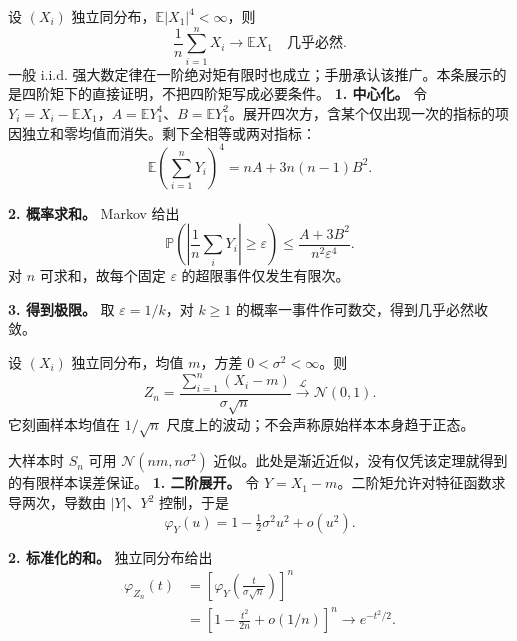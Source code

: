 设 $(X_i)$ 独立同分布，$\mathbb E|X_1|^4<\infty$，则
\[
\frac1n\sum_{i=1}^nX_i
\longrightarrow\mathbb EX_1\quad\text{几乎必然}.
\]
一般 i.i.d. 强大数定律在一阶绝对矩有限时也成立；手册承认该推广。本条展示的是四阶矩下的直接证明，不把四阶矩写成必要条件。
\textbf{1. 中心化。} 令 $Y_i=X_i-\mathbb EX_1$，$A=\mathbb EY_1^4$、$B=\mathbb EY_1^2$。展开四次方，含某个仅出现一次的指标的项因独立和零均值而消失。剩下全相等或两对指标：
\[
\mathbb E\left(\sum_{i=1}^nY_i\right)^4
=nA+3n(n-1)B^2.
\]

\textbf{2. 概率求和。} Markov 给出
\[
\mathbb P\left(\left|\frac1n\sum_iY_i\right|\ge\varepsilon\right)
\le\frac{A+3B^2}{n^2\varepsilon^4}.
\]
对 $n$ 可求和，故每个固定 $\varepsilon$ 的超限事件仅发生有限次。

\textbf{3. 得到极限。} 取 $\varepsilon=1/k$，对 $k\ge1$ 的概率一事件作可数交，得到几乎必然收敛。

设 $(X_i)$ 独立同分布，均值 $m$，方差 $0<\sigma^2<\infty$。则
\[
Z_n=\frac{\sum_{i=1}^n(X_i-m)}{\sigma\sqrt n}
\xrightarrow{\mathcal L}\mathcal N(0,1).
\]
它刻画样本均值在 $1/\sqrt n$ 尺度上的波动；不会声称原始样本本身趋于正态。

大样本时 $S_n$ 可用 $\mathcal N(nm,n\sigma^2)$ 近似。此处是渐近近似，没有仅凭该定理就得到的有限样本误差保证。
\textbf{1. 二阶展开。} 令 $Y=X_1-m$。二阶矩允许对特征函数求导两次，导数由 $|Y|$、$Y^2$ 控制，于是
\[
\varphi_Y(u)=1-\tfrac12\sigma^2u^2+o(u^2).
\]

\textbf{2. 标准化的和。} 独立同分布给出
\[
\begin{aligned}
\varphi_{Z_n}(t)
&=\left[\varphi_Y\!\left(\frac{t}{\sigma\sqrt n}\right)\right]^n\\
&=\left[1-\frac{t^2}{2n}+o(1/n)\right]^n
\longrightarrow e^{-t^2/2}.
\end{aligned}
\]

